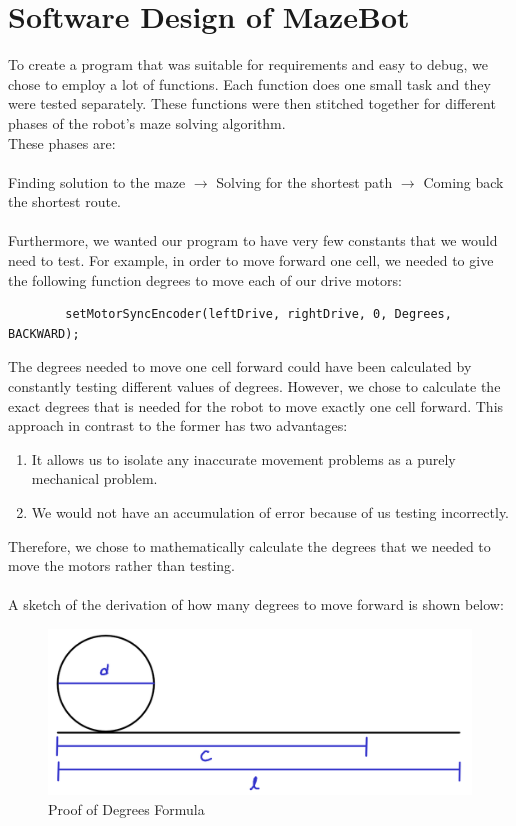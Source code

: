 \documentclass[11pt]{article}
\begin{document}
\section{Software Design of MazeBot}
To create a program that was suitable for requirements and easy to debug, we chose to employ a lot of functions. Each function does one small task and they were tested separately. These functions were then stitched together for different phases of the robot's maze solving algorithm.\\
These phases are:\\\\
Finding solution to the maze $\to$ Solving for the shortest path $\to$ Coming back the shortest route.\\\\
Furthermore, we wanted our program to have very few constants that we would need to test. For example, in order to move forward one cell, we needed to give the following function degrees to move each of our drive motors:
\begin{verbatim}
		setMotorSyncEncoder(leftDrive, rightDrive, 0, Degrees, BACKWARD);
\end{verbatim}
The degrees needed to move one cell forward could have been calculated by constantly testing different values of degrees. However, we chose to calculate the exact degrees that is needed for the robot to move exactly one cell forward. This approach in contrast to the former has two advantages: 
\begin{enumerate}
\item It allows us to isolate any inaccurate movement problems as a purely mechanical problem.
\item We would not have an accumulation of error because of us testing incorrectly.
\end{enumerate}
Therefore, we chose to mathematically calculate the degrees that we needed to move the motors rather than testing.\\\\
A sketch of the derivation of how many degrees to move forward is shown below: %
\begin{figure}[htp]
\centering
\includegraphics[scale=0.3]{images/Movement_Distance.png}
\caption{Proof of Degrees Formula}
\label{}
\end{figure}
\end{document}
